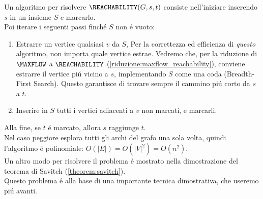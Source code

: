Un algoritmo per risolvere $\REACHABILITY(G, s, t)$ consiste nell'iniziare inserendo $s$ in un insieme $S$ e marcarlo. \\
Poi iterare i seguenti passi finché $S$ non é vuoto:
\begin{enumerate}
    \item Estrarre un vertice qualsiasi $v$ da $S$,
        \subitem Per la correttezza ed efficienza di \textit{questo} algoritmo, non importa quale vertice estrae. 
        Vedremo che, per la riduzione di $\MAXFLOW$ a $\REACHABILITY$ 
        (\ref{riduzione:maxflow_reachability}), 
        conviene estrarre il vertice piú vicino a $s$,
        implementando $S$ come una coda (Breadth-First Search).
        Questo garantisce di trovare sempre il cammino piú corto da $s$ a $t$.
    \item Inserire in $S$ tutti i vertici adiacenti a $v$ non marcati, e marcarli.
\end{enumerate}
Alla fine, se $t$ é marcato, allora $s$ raggiunge $t$. \\
Nel caso peggiore esplora tutti gli archi del grafo una sola volta, quindi l'algoritmo é polinomiale: $O(|E|) = O(|V|^2) = O(n^2)$. \\

Un altro modo per risolvere il problema é mostrato nella dimostrazione del teorema di Savitch (\ref{theorem:savitch}). \\

Questo problema é alla base di una importante tecnica dimostrativa, che useremo piú avanti.


